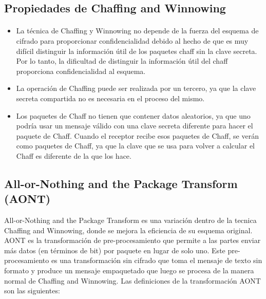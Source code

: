 \documentclass[12pt, a4paper, titlepage]{report}
\begin{document}
        \subsection{Propiedades de Chaffing and Winnowing}
        
        \paragraph{}
        \begin{itemize}
		    \item La técnica de Chaffing y Winnowing no depende de la fuerza del esquema de cifrado para proporcionar confidencialidad debido al hecho de que es muy difícil distinguir la informaci\'on \'util de los paquetes chaff sin la clave secreta. Por lo tanto, la dificultad de distinguir la informaci\'on \'util del chaff proporciona confidencialidad al esquema.
		    \item La operación de Chaffing puede ser realizada por un tercero, ya que la clave secreta compartida no es necesaria en el proceso del mismo.
		    \item Los paquetes de Chaff no tienen que contener datos aleatorios, ya que uno podría usar un mensaje válido con una clave secreta diferente para hacer el paquete de Chaff. Cuando el receptor recibe esos paquetes de Chaff, se verán como paquetes de Chaff, ya que la clave que se usa para volver a calcular el Chaff es diferente de la que los hace.
		\end{itemize}
		
		\subsection{All-or-Nothing and the Package Transform (AONT)}
        
        All-or-Nothing and the Package Transform es una variación dentro de la tecnica Chaffing and Winnowing, donde se mejora la eficiencia de su esquema original. AONT es la transformación de pre-procesamiento que permite a las partes enviar más datos (en términos de bit) por paquete en lugar de solo uno. Este pre-procesamiento es una transformación sin cifrado que toma el mensaje de texto sin formato y produce un mensaje empaquetado que luego se procesa de la manera normal de Chaffing and Winnowing. Las definiciones de la transformación AONT son las siguientes:
        
\end{document}
